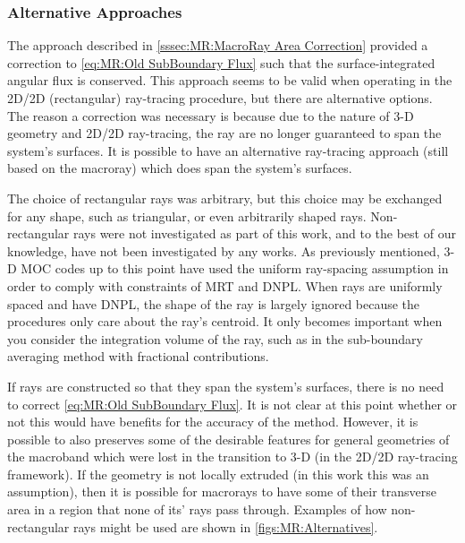 {{{      \subsubsection{Alternative Approaches}{\label{sssec:MR:Alternative Approaches}
        The approach described in \cref{sssec:MR:MacroRay Area Correction} provided a correction to \cref{eq:MR:Old SubBoundary Flux} such that the surface-integrated angular flux is conserved.
        This approach seems to be valid when operating in the 2D/2D (rectangular) ray-tracing procedure, but there are alternative options.
        The reason a correction was necessary is because due to the nature of 3-D geometry and 2D/2D ray-tracing, the ray are no longer guaranteed to span the system's surfaces.
        It is possible to have an alternative ray-tracing approach (still based on the macroray) which does span the system's surfaces.

        The choice of rectangular rays was arbitrary, but this choice may be exchanged for any shape, such as triangular, or even arbitrarily shaped rays.
        Non-rectangular rays were not investigated as part of this work, and to the best of our knowledge, have not been investigated by any works.
        As previously mentioned, 3-D \ac{MOC} codes up to this point have used the uniform ray-spacing assumption in order to comply with constraints of \ac{MRT} and \ac{DNPL}.
        When rays are uniformly spaced and have \ac{DNPL}, the shape of the ray is largely ignored because the procedures only care about the ray's centroid.
        It only becomes important when you consider the integration volume of the ray, such as in the sub-boundary averaging method with fractional contributions.

        If rays are constructed so that they span the system's surfaces, there is no need to correct \cref{eq:MR:Old SubBoundary Flux}.
        It is not clear at this point whether or not this would have benefits for the accuracy of the method.
        However, it is possible to also preserves some of the desirable features for general geometries of the macroband which were lost in the transition to 3-D (in the 2D/2D ray-tracing framework).
        If the geometry is not locally extruded (in this work this was an assumption), then it is possible for macrorays to have some of their transverse area in a region that none of its' rays pass through.
        Examples of how non-rectangular rays might be used are shown in \cref{figs:MR:Alternatives}.

}}}}
